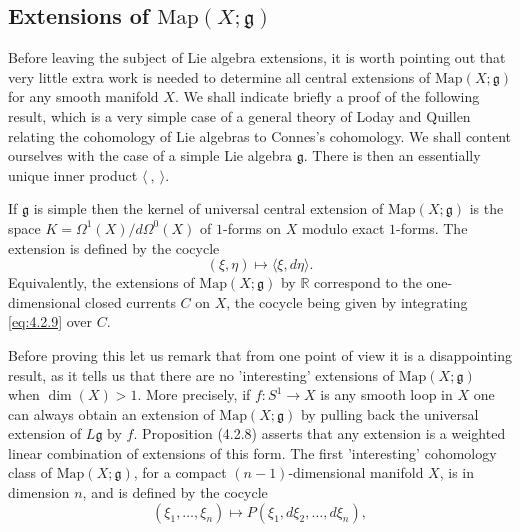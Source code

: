\documentclass[12pt]{article}
\begin{document}
\subsection{Extensions of $\mathrm{Map}(X;\mathfrak{g})$}

Before leaving the subject of Lie algebra extensions, it is worth pointing
out that very little extra work is needed to determine all central extensions of
$\mathrm{Map}(X;\mathfrak{g})$ for any smooth manifold $X$. We shall indicate briefly
a proof of the following result, which is a very simple case of a general theory of
Loday and Quillen relating the cohomology of Lie algebras to Connes's cohomology. We shall content ourselves with the case of a simple Lie
algebra $\mathfrak{g}$. There is then an essentially unique inner product
$\langle \ , \ \rangle$.

\begin{proposition}[4.2.8]
    If $\mathfrak{g}$ is simple then the kernel of universal central extension
    of $\mathrm{Map}(X;\mathfrak{g})$ is the space
    $K = \Omega^1(X)/d\Omega^0(X)$ of $1$-forms on $X$ modulo exact $1$-forms.
    The extension is defined by the cocycle
    \begin{equation} \label{eq:4.2.9}
        (\xi,\eta) \mapsto \langle \xi, d\eta \rangle.
    \end{equation}
    Equivalently, the extensions of $\mathrm{Map}(X;\mathfrak{g})$ by $\mathbb{R}$
    correspond to the one-dimensional closed currents $C$ on $X$, the cocycle being
    given by integrating \eqref{eq:4.2.9} over $C$.
\end{proposition}

\medskip

Before proving this let us remark that from one point of view it is a
disappointing result, as it tells us that there are no 'interesting' extensions
of $\mathrm{Map}(X;\mathfrak{g})$ when $\dim(X) > 1$. More precisely,
if $f : S^1 \to X$ is any smooth loop in $X$ one can always obtain an extension
of $\mathrm{Map}(X;\mathfrak{g})$ by pulling back the universal extension of
$L\mathfrak{g}$ by $f$. Proposition (4.2.8) asserts that any extension is a weighted
linear combination of extensions of this form. The first 'interesting' cohomology
class of $\mathrm{Map}(X;\mathfrak{g})$, for a compact $(n-1)$-dimensional manifold $X$,
is in dimension $n$, and is defined by the cocycle
\[
    (\xi_1,\ldots,\xi_n) \mapsto P(\xi_1, d\xi_2,\ldots,d\xi_n),
\]
\end{document}
